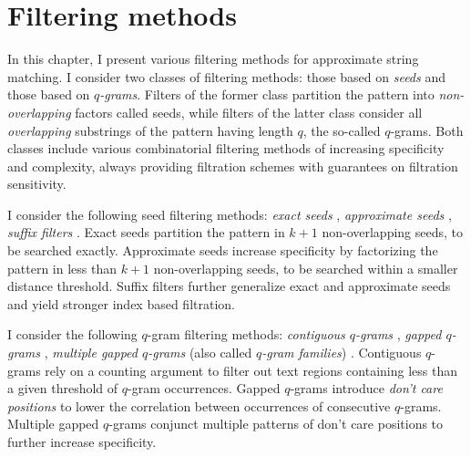 \chapter{Filtering methods}
\label{sec:filter}

In this chapter, I present various filtering methods for approximate string matching.
I consider two classes of filtering methods: those based on \emph{seeds} and those based on \emph{$q$-grams}.
Filters of the former class partition the pattern into \emph{non-overlapping} factors called seeds, while filters of the latter class consider all \emph{overlapping} substrings of the pattern having length $q$, the so-called $q$-grams.
Both classes include various combinatorial filtering methods of increasing specificity and complexity, always providing filtration schemes with guarantees on filtration sensitivity.

I consider the following seed filtering methods:
\emph{exact seeds} \citep{Baeza1992},
\emph{approximate seeds} \citep{Myers1994,Navarro2000},
\emph{suffix filters} \citep{Kaerkkaeinen2007}.
Exact seeds partition the pattern in $k+1$ non-overlapping seeds, to be searched exactly.
Approximate seeds increase specificity by factorizing the pattern in less than $k+1$ non-overlapping seeds, to be searched within a smaller distance threshold.
Suffix filters further generalize exact and approximate seeds and yield stronger index based filtration.

I consider the following $q$-gram filtering methods:
\emph{contiguous $q$-grams} \citep{Jokinen1991},
\emph{gapped $q$-grams} \citep{Burkhardt2001},
\emph{multiple gapped $q$-grams} (also called \emph{$q$-gram families}) \citep{Kucherov2005}.
Contiguous $q$-grams rely on a counting argument to filter out text regions containing less than a given threshold of $q$-gram occurrences.
Gapped $q$-grams introduce \emph{don't care positions} to lower the correlation between occurrences of consecutive $q$-grams.
Multiple gapped $q$-grams conjunct multiple patterns of don't care positions to further increase specificity.

